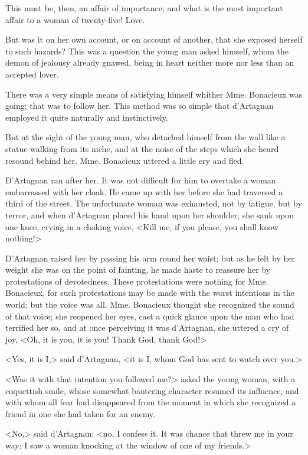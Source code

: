 This must be, then, an affair of importance; and what is the most important affair to a woman of twenty-five! Love. 

But was it on her own account, or on account of another, that she exposed herself to such hazards? This was a question the young man asked himself, whom the demon of jealousy already gnawed, being in heart neither more nor less than an accepted lover. 

There was a very simple means of satisfying himself whither Mme. Bonacieux was going; that was to follow her. This method was so simple that d'Artagnan employed it quite naturally and instinctively. 

But at the sight of the young man, who detached himself from the wall like a statue walking from its niche, and at the noise of the steps which she heard resound behind her, Mme. Bonacieux uttered a little cry and fled. 

D'Artagnan ran after her. It was not difficult for him to overtake a woman embarrassed with her cloak. He came up with her before she had traversed a third of the street. The unfortunate woman was exhausted, not by fatigue, but by terror, and when d'Artagnan placed his hand upon her shoulder, she sank upon one knee, crying in a choking voice, <Kill me, if you please, you shall know nothing!> 

D'Artagnan raised her by passing his arm round her waist; but as he felt by her weight she was on the point of fainting, he made haste to reassure her by protestations of devotedness. These protestations were nothing for Mme. Bonacieux, for such protestations may be made with the worst intentions in the world; but the voice was all. Mme. Bonacieux thought she recognized the sound of that voice; she reopened her eyes, cast a quick glance upon the man who had terrified her so, and at once perceiving it was d'Artagnan, she uttered a cry of joy, <Oh, it is you, it is you! Thank God, thank God!> 

<Yes, it is I,> said d'Artagnan, <it is I, whom God has sent to watch over you.> 

<Was it with that intention you followed me?> asked the young woman, with a coquettish smile, whose somewhat bantering character resumed its influence, and with whom all fear had disappeared from the moment in which she recognized a friend in one she had taken for an enemy. 

<No,> said d'Artagnan; <no, I confess it. It was chance that threw me in your way; I saw a woman knocking at the window of one of my friends.> 

